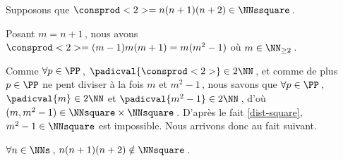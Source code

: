 Supposons que $\consprod<2> = n(n+1)(n+2) \in \NNssquare$\,.

\medskip

Posant $m = n+1$\,, nous avons $\consprod<2> = (m-1)m(m+1) = m(m^2 - 1)$ où $m \in \NN_{\geq 2}$\,.

\medskip

Comme $\forall p \in \PP$\,, $\padicval{\consprod<2>} \in 2 \NN$\,, et comme de plus $p \in \PP$ ne pent diviser à la fois $m$ et $m^2 - 1$\,, nous savons que 
$\forall p \in \PP$\,, 
$\padicval{m} \in 2 \NN$ et $\padicval{m^2 - 1} \in 2 \NN$\,,
d'où 
$(m, m^2 - 1) \in \NNsquare \times \NNsquare$\,.
D'après le fait \ref{dist-square}, $m^2 - 1 \in \NNsquare$ est impossible.
%
Nous arrivons donc au fait suivant. 

\begin{fact} \label{case-3}
	 $\forall n \in \NNs$\,, $n(n+1)(n+2) \notin \NNsquare$\,.
\end{fact}
